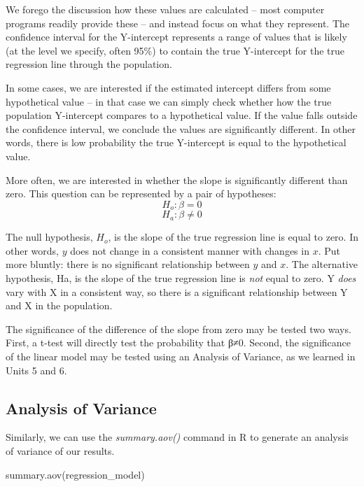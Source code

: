 \documentclass[
]{book}
\newenvironment{Shaded}{\begin{snugshade}}{\end{snugshade}}
\newcommand{\FunctionTok}[1]{\textcolor[rgb]{0.00,0.00,0.00}{#1}}
\newcommand{\NormalTok}[1]{#1}
\begin{document}
We forego the discussion how these values are calculated -- most computer programs readily provide these -- and instead focus on what they represent. The confidence interval for the Y-intercept represents a range of values that is likely (at the level we specify, often 95\%) to contain the true Y-intercept for the true regression line through the population.

In some cases, we are interested if the estimated intercept differs from some hypothetical value -- in that case we can simply check whether how the true population Y-intercept compares to a hypothetical value. If the value falls outside the confidence interval, we conclude the values are significantly different. In other words, there is low probability the true Y-intercept is equal to the hypothetical value.

More often, we are interested in whether the slope is significantly different than zero. This question can be represented by a pair of hypotheses:
\[ H_o: \beta = 0\]
\[ H_a: \beta \ne 0\]

The null hypothesis, \(H_o\), is the slope of the true regression line is equal to zero. In other words, \(y\) does not change in a consistent manner with changes in \(x\). Put more bluntly: there is no significant relationship between \(y\) and \(x\). The alternative hypothesis, Ha, is the slope of the true regression line is \emph{not} equal to zero. Y \emph{does} vary with X in a consistent way, so there is a significant relationship between Y and X in the population.

The significance of the difference of the slope from zero may be tested two ways. First, a t-test will directly test the probability that β≠0. Second, the significance of the linear model may be tested using an Analysis of Variance, as we learned in Units 5 and 6.

\hypertarget{analysis-of-variance-4}{%
\subsection{Analysis of Variance}\label{analysis-of-variance-4}}

Similarly, we can use the \emph{summary.aov()} command in R to generate an analysis of variance of our results.

\begin{Shaded}
\begin{Highlighting}[]
\FunctionTok{summary.aov}\NormalTok{(regression\_model)}
\end{Highlighting}
\end{Shaded}
\end{document}
